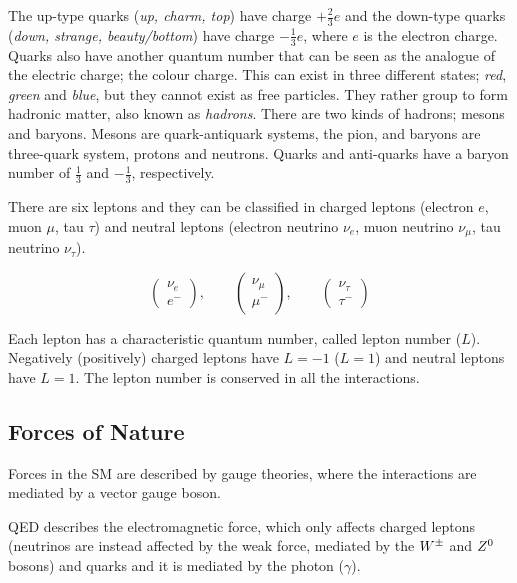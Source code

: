 			\noindent The up-type quarks (\textit{up, charm, top}) have charge $+\frac{2}{3}e$ and the down-type quarks (\textit{down, strange, beauty/bottom}) have charge $-\frac{1}{3}e$, where $e$ is the electron charge. Quarks also have another quantum number that can be seen as the analogue of the electric charge; the colour charge. This can exist in three different states; \textit{red}, \textit{green} and \textit{blue}, but they cannot exist as free particles. They rather group to form hadronic matter, also known as \emph{hadrons}. There are two kinds of hadrons; mesons and baryons. Mesons are quark-antiquark systems, \eg the pion, and baryons are three-quark system, \eg protons and neutrons. Quarks and anti-quarks have a baryon number of $\frac{1}{3}$ and $-\frac{1}{3}$, respectively.

			There are six leptons and they can be classified in charged leptons (electron $e$, muon $\mu$, tau $\tau$) and neutral leptons (electron neutrino $\nu_e$, muon neutrino $\nu_{\mu}$, tau neutrino $\nu_{\tau}$).
			
			\begin{equation*}
			\label{eq:lepton_flavor_doublets}
				\begin{pmatrix} \nu_e      \\ e^-    \end{pmatrix}, \qquad
				\begin{pmatrix} \nu_{\mu}  \\ \mu^-  \end{pmatrix}, \qquad
				\begin{pmatrix} \nu_{\tau} \\ \tau^- \end{pmatrix}
			\end{equation*}

			Each lepton has a characteristic quantum number, called lepton number ($L$). Negatively (positively) charged leptons have $L=-1$ ($L=1$) and neutral leptons have $L=1$. The lepton number is conserved in all the interactions. 



		\subsection*{Forces of Nature}

			Forces in the \ac{SM} are described by gauge theories, where the interactions are mediated by a vector gauge boson. 

			\ac{QED} describes the electromagnetic force, which only affects charged leptons (neutrinos are instead affected by the weak force, mediated by the $W^{\pm}$ and $Z^0$ bosons) and quarks and it is mediated by the photon ($\gamma$).

